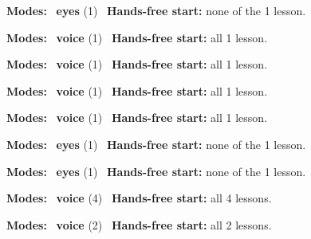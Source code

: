 \expandafter\def\csname hlchaptermodality96\endcsname{%
  {\small\noindent
    \textbf{Modes:} \hlsightsign{}~\textbf{eyes} (1)\quad
    \hlvoicesign{}~\textbf{Hands-free start:} none of the 1 lesson.%
    \par}\medskip
}

\expandafter\def\csname hlchaptermodality97\endcsname{%
  {\small\noindent
    \textbf{Modes:} \hlvoicesign{}~\textbf{voice} (1)\quad
    \hlvoicesign{}~\textbf{Hands-free start:} all 1 lesson.%
    \par}\medskip
}

\expandafter\def\csname hlchaptermodality98\endcsname{%
  {\small\noindent
    \textbf{Modes:} \hlvoicesign{}~\textbf{voice} (1)\quad
    \hlvoicesign{}~\textbf{Hands-free start:} all 1 lesson.%
    \par}\medskip
}

\expandafter\def\csname hlchaptermodality99\endcsname{%
  {\small\noindent
    \textbf{Modes:} \hlvoicesign{}~\textbf{voice} (1)\quad
    \hlvoicesign{}~\textbf{Hands-free start:} all 1 lesson.%
    \par}\medskip
}

\expandafter\def\csname hlchaptermodality100\endcsname{%
  {\small\noindent
    \textbf{Modes:} \hlvoicesign{}~\textbf{voice} (1)\quad
    \hlvoicesign{}~\textbf{Hands-free start:} all 1 lesson.%
    \par}\medskip
}

\expandafter\def\csname hlchaptermodality101\endcsname{%
  {\small\noindent
    \textbf{Modes:} \hlsightsign{}~\textbf{eyes} (1)\quad
    \hlvoicesign{}~\textbf{Hands-free start:} none of the 1 lesson.%
    \par}\medskip
}

\expandafter\def\csname hlchaptermodality102\endcsname{%
  {\small\noindent
    \textbf{Modes:} \hlsightsign{}~\textbf{eyes} (1)\quad
    \hlvoicesign{}~\textbf{Hands-free start:} none of the 1 lesson.%
    \par}\medskip
}

\expandafter\def\csname hlchaptermodality103\endcsname{%
  {\small\noindent
    \textbf{Modes:} \hlvoicesign{}~\textbf{voice} (4)\quad
    \hlvoicesign{}~\textbf{Hands-free start:} all 4 lessons.%
    \par}\medskip
}

\expandafter\def\csname hlchaptermodality104\endcsname{%
  {\small\noindent
    \textbf{Modes:} \hlvoicesign{}~\textbf{voice} (2)\quad
    \hlvoicesign{}~\textbf{Hands-free start:} all 2 lessons.%
    \par}\medskip
}

